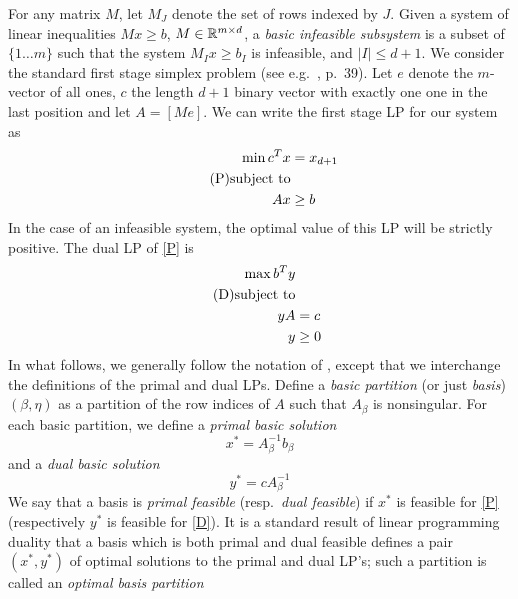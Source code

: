 \documentclass[charterfonts,lotsofwhite]{patmorin}
\begin{document}
For any matrix $M$, let $M_J$ denote the set of rows indexed by $J$.
Given a system of linear inequalities $Mx \geq b$, $M \in \mathbb{R}^{m \times
  d}$, a \emph{basic infeasible subsystem} is a subset of $\{ 1 \dots
m\}$ such that the system $M_I x \geq b_I$ is infeasible, and $|I|
\leq d+1$. 
 We consider the standard first stage simplex
problem (see e.g.~\cite{chvatal80}, p.~39). Let  $e$ denote the
$m$-vector of all ones, $c$ the length $d+1$ binary vector with
exactly one one in the last position and let $A=[M e]$. We can write the first stage LP for our system as
\begin{align*}
    \min c^Tx &= x_{d+1}\\\tag{P}\eqlabel{P}
    \text{subject to}\\
    Ax &\geq b
\end{align*}
  In the case of an
infeasible system, the optimal value of this LP will be strictly
positive. 
The dual LP of \eqref{P} is
\begin{align*}
  \max b^T y\\\tag{D}
  \eqlabel{D}
  \text{subject to}\\
  yA &= c\\
  y & \geq 0
\end{align*}
In what follows, we generally follow the notation of \cite{megiddo91},
except that we interchange the definitions of the primal and dual LPs.
Define a \emph{basic partition} (or just \emph{basis}) $(\beta,\eta)$
as a partition of the row indices of $A$ such that $A_\beta$ is
nonsingular.  For each basic partition, we define a \emph{primal basic
  solution}
\begin{equation*}
  x^*=A_\beta^{-1} b_\beta
\end{equation*}
and a \emph{dual basic solution}
\begin{equation*}
  y^*= c A^{-1}_\beta
\end{equation*}
We say that a basis is \emph{primal feasible} (resp.\ \emph{dual
  feasible}) if $x^*$ is feasible for \eqref{P} (respectively $y^*$
is feasible for \eqref{D}).  It is a standard result of linear
programming duality that a basis which is both primal and dual feasible
defines a pair $(x^*,y^*)$ of optimal solutions to the primal and dual
LP's; such a partition is called an \emph{optimal basis partition}
\end{document}
